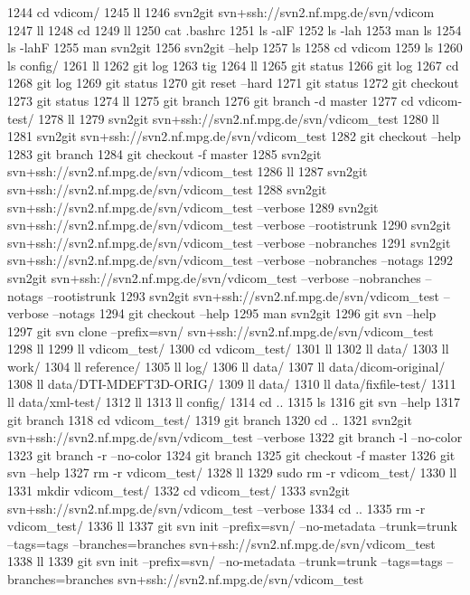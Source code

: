  1244  cd vdicom/
 1245  ll
 1246  svn2git svn+ssh://svn2.nf.mpg.de/svn/vdicom
 1247  ll
 1248  cd
 1249  ll
 1250  cat .bashrc
 1251  ls -alF
 1252  ls -lah
 1253  man ls
 1254  ls -lahF
 1255  man svn2git
 1256  svn2git --help
 1257  ls
 1258  cd vdicom
 1259  ls
 1260  ls config/
 1261  ll
 1262  git log
 1263  tig
 1264  ll
 1265  git status
 1266  git log
 1267  cd
 1268  git log
 1269  git status
 1270  git reset --hard
 1271  git status
 1272  git checkout
 1273  git status
 1274  ll
 1275  git branch
 1276  git branch -d master
 1277  cd vdicom-test/
 1278  ll
 1279  svn2git svn+ssh://svn2.nf.mpg.de/svn/vdicom_test
 1280  ll
 1281  svn2git svn+ssh://svn2.nf.mpg.de/svn/vdicom_test
 1282  git checkout --help
 1283  git branch
 1284  git checkout -f master
 1285  svn2git svn+ssh://svn2.nf.mpg.de/svn/vdicom_test
 1286  ll
 1287  svn2git svn+ssh://svn2.nf.mpg.de/svn/vdicom_test
 1288  svn2git svn+ssh://svn2.nf.mpg.de/svn/vdicom_test --verbose
 1289  svn2git svn+ssh://svn2.nf.mpg.de/svn/vdicom_test --verbose --rootistrunk
 1290  svn2git svn+ssh://svn2.nf.mpg.de/svn/vdicom_test --verbose --nobranches
 1291  svn2git svn+ssh://svn2.nf.mpg.de/svn/vdicom_test --verbose --nobranches --notags
 1292  svn2git svn+ssh://svn2.nf.mpg.de/svn/vdicom_test --verbose --nobranches --notags --rootistrunk
 1293  svn2git svn+ssh://svn2.nf.mpg.de/svn/vdicom_test --verbose --notags
 1294  git checkout --help
 1295  man svn2git
 1296  git svn --help
 1297  git svn clone --prefix=svn/ svn+ssh://svn2.nf.mpg.de/svn/vdicom_test
 1298  ll
 1299  ll vdicom_test/
 1300  cd vdicom_test/
 1301  ll
 1302  ll data/
 1303  ll work/
 1304  ll reference/
 1305  ll log/
 1306  ll data/
 1307  ll data/dicom-original/
 1308  ll data/DTI-MDEFT3D-ORIG/
 1309  ll data/
 1310  ll data/fixfile-test/
 1311  ll data/xml-test/
 1312  ll
 1313  ll config/
 1314  cd ..
 1315  ls
 1316  git svn --help
 1317  git branch
 1318  cd vdicom_test/
 1319  git branch
 1320  cd ..
 1321  svn2git svn+ssh://svn2.nf.mpg.de/svn/vdicom_test --verbose
 1322  git branch -l --no-color
 1323  git branch -r --no-color
 1324  git branch
 1325  git checkout -f master
 1326  git svn --help
 1327  rm -r vdicom_test/
 1328  ll
 1329  sudo rm -r vdicom_test/
 1330  ll
 1331  mkdir vdicom_test/
 1332  cd vdicom_test/
 1333  svn2git svn+ssh://svn2.nf.mpg.de/svn/vdicom_test --verbose
 1334  cd ..
 1335  rm -r vdicom_test/
 1336  ll
 1337  git svn init --prefix=svn/ --no-metadata --trunk=trunk --tags=tags --branches=branches svn+ssh://svn2.nf.mpg.de/svn/vdicom_test
 1338  ll
 1339  git svn init --prefix=svn/ --no-metadata --trunk=trunk --tags=tags --branches=branches svn+ssh://svn2.nf.mpg.de/svn/vdicom_test
